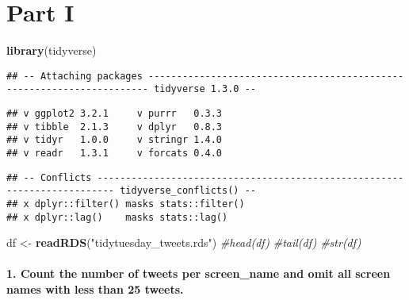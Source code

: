 \documentclass[]{article}
\title{}
\author{}
\date{}
\newenvironment{Shaded}{\begin{snugshade}}{\end{snugshade}}
\newcommand{\CommentTok}[1]{\textcolor[rgb]{0.56,0.35,0.01}{\textit{#1}}}
\newcommand{\KeywordTok}[1]{\textcolor[rgb]{0.13,0.29,0.53}{\textbf{#1}}}
\newcommand{\NormalTok}[1]{#1}
\newcommand{\OperatorTok}[1]{\textcolor[rgb]{0.81,0.36,0.00}{\textbf{#1}}}
\newcommand{\StringTok}[1]{\textcolor[rgb]{0.31,0.60,0.02}{#1}}
\let\oldparagraph\paragraph
\renewcommand{\paragraph}[1]{\oldparagraph{#1}\mbox{}}
\begin{document}
\hypertarget{part-i}{%
\section{Part I}\label{part-i}}

\begin{Shaded}
\begin{Highlighting}[]
\KeywordTok{library}\NormalTok{(tidyverse)}
\end{Highlighting}
\end{Shaded}

\begin{verbatim}
## -- Attaching packages ---------------------------------------------------------------------- tidyverse 1.3.0 --
\end{verbatim}

\begin{verbatim}
## v ggplot2 3.2.1     v purrr   0.3.3
## v tibble  2.1.3     v dplyr   0.8.3
## v tidyr   1.0.0     v stringr 1.4.0
## v readr   1.3.1     v forcats 0.4.0
\end{verbatim}

\begin{verbatim}
## -- Conflicts ------------------------------------------------------------------------- tidyverse_conflicts() --
## x dplyr::filter() masks stats::filter()
## x dplyr::lag()    masks stats::lag()
\end{verbatim}

\begin{Shaded}
\begin{Highlighting}[]
\NormalTok{df <-}\StringTok{ }\KeywordTok{readRDS}\NormalTok{(}\StringTok{"tidytuesday_tweets.rds"}\NormalTok{)}
\CommentTok{#head(df)}
\CommentTok{#tail(df)}
\CommentTok{#str(df)}
\end{Highlighting}
\end{Shaded}

\hypertarget{count-the-number-of-tweets-per-screen_name-and-omit-all-screen-names-with-less-than-25-tweets.}{%
\paragraph{1. Count the number of tweets per screen\_name and omit all
screen names with less than 25
tweets.}\label{count-the-number-of-tweets-per-screen_name-and-omit-all-screen-names-with-less-than-25-tweets.}}

\begin{Shaded}
\end{Shaded}
\end{document}
